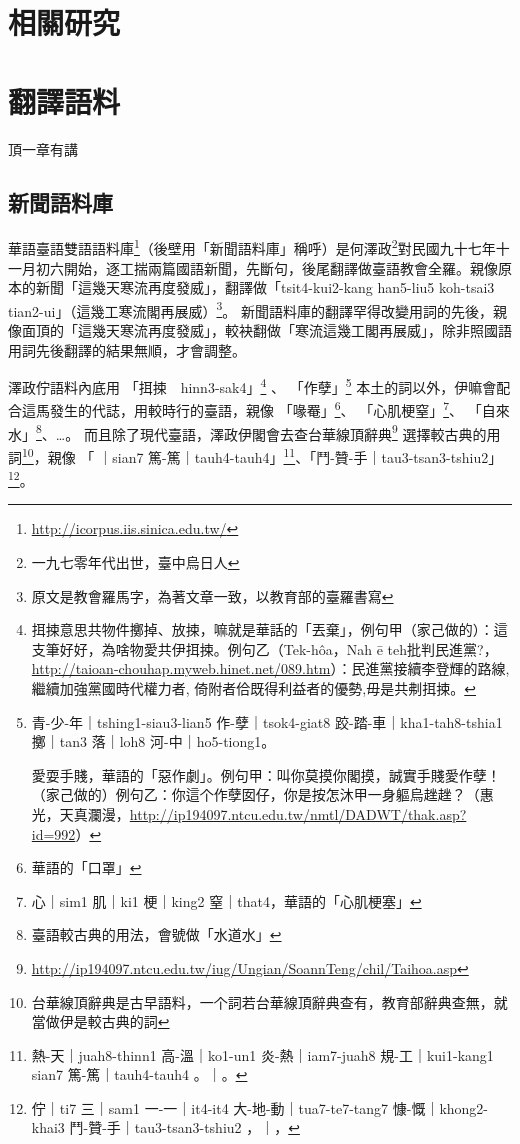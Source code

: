 \documentclass[final,oneside,onecolumn,12pt,a4paper]{book}%
\begin{document}
\chapter{相關研究}
\label{章：相關研究}


\chapter{翻譯語料}
\label{章：翻譯語料}

頂一章有講

\section{新聞語料庫}
\label{節：新聞語料庫}
華語臺語雙語語料庫\footnote{\url{http://icorpus.iis.sinica.edu.tw/}}（後壁用「新聞語料庫」稱呼）是何澤政\footnote{一九七零年代出世，臺中烏日人}對民國九十七年十一月初六開始，逐工揣兩篇國語新聞，先斷句，後尾翻譯做臺語教會全羅。親像原本的新聞「這幾天寒流再度發威」，翻譯做「tsit4-kui2-kang han5-liu5 koh-tsai3 tian2-ui」（這幾工寒流閣再展威）\footnote{原文是教會羅馬字，為著文章一致，以教育部的臺羅書寫}。
新聞語料庫的翻譯罕得改變用詞的先後，親像面頂的「這幾天寒流再度發威」，較袂翻做「寒流這幾工閣再展威」，除非照國語用詞先後翻譯的結果無順，才會調整。

澤政佇語料內底用
「挕捒　hinn3-sak4」\footnote{挕捒意思共物件擲掉、放捒，嘛就是華話的「丟棄」，例句甲（家己做的）：這支筆好好，為啥物愛共伊挕捒。例句乙（Tek-hôa，Nah ē teh批判民進黨?，\url{http://taioan-chouhap.myweb.hinet.net/089.htm}）：民進黨接續李登輝的路線, 繼續加強黨國時代權力者, 倚附者佮既得利益者的優勢,毋是共刜挕捒。}
、
「作孽」\footnote{
青-少-年｜tshing1-siau3-lian5 作-孽｜tsok4-giat8 跤-踏-車｜kha1-tah8-tshia1 擲｜tan3 落｜loh8 河-中｜ho5-tiong1。

愛耍手賤，華語的「惡作劇」。例句甲：叫你莫摸你閣摸，誠實手賤愛作孽！（家己做的）例句乙：你這个作孽囡仔，你是按怎沐甲一身軀烏趖趖？（惠光，天真瀾漫，\url{http://ip194097.ntcu.edu.tw/nmtl/DADWT/thak.asp?id=992}）}
本土的詞以外，伊嘛會配合這馬發生的代誌，用較時行的臺語，親像
「喙罨」\footnote{華語的「口罩」}、
「心肌梗窒」\footnote{心｜sim1 肌｜ki1 梗｜king2 窒｜that4，華語的「心肌梗塞」}、
「自來水」\footnote{臺語較古典的用法，會號做「水道水」}、…。
而且除了現代臺語，澤政伊閣會去查台華線頂辭典\footnote{\url{http://ip194097.ntcu.edu.tw/iug/Ungian/SoannTeng/chil/Taihoa.asp}}
選擇較古典的用詞\footnote{台華線頂辭典是古早語料，一个詞若台華線頂辭典查有，教育部辭典查無，就當做伊是較古典的詞}，親像
「𤺪｜sian7 篤-篤｜tauh4-tauh4」\footnote{熱-天｜juah8-thinn1 高-溫｜ko1-un1 炎-熱｜iam7-juah8 規-工｜kui1-kang1 𤺪｜sian7 篤-篤｜tauh4-tauh4 。｜。}、「鬥-贊-手｜tau3-tsan3-tshiu2」\footnote{佇｜ti7 三｜sam1 一-一｜it4-it4 大-地-動｜tua7-te7-tang7 慷-慨｜khong2-khai3 鬥-贊-手｜tau3-tsan3-tshiu2 ，｜，}。
\end{document}
